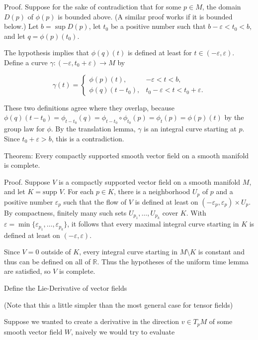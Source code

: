 Proof. 
Suppose for the sake of contradiction that for some \(p \in M\), 
the domain \(D(p)\) of \(\phi(p)\) is bounded above. (A similar proof works if it is bounded below.) 
Let \(b = \sup D(p)\), let \(t_0\) be a positive number such that \(b - \varepsilon < t_0 < b\), and let \(q = \phi(p)(t_0)\).

The hypothesis implies that \(\phi(q)(t)\) is defined at least for 
\(t \in (-\varepsilon, \varepsilon)\). 
Define a curve \(\gamma : (-\varepsilon, t_0 + \varepsilon) \to M\) by 

\[\gamma(t) = \begin{cases}
\phi(p)(t), & -\varepsilon < t < b, \\
\phi(q)(t - t_0), & t_0 - \varepsilon < t < t_0 + \varepsilon.
\end{cases}\]

These two definitions agree where they overlap, because 
\(\phi(q)(t - t_0) = \phi_{t-t_0}(q) = \phi_{t-t_0} \circ \phi_{t_0} (p) = \phi_{t} (p) = \phi(p)(t)\) 
by the group law for \(\phi\). 
By the translation lemma, \(\gamma\) is an integral curve starting at \(p\). 
Since \(t_0 + \varepsilon > b\), this is a contradiction.

Theorem: Every compactly supported smooth vector field on a smooth manifold is complete.

Proof. 
Suppose \(V\) is a compactly supported vector field on a smooth manifold \(M\), and let \(K = \text{supp } V\). 
For each \(p \in K\), there is a neighborhood \(U_p\) of \(p\) and a positive number \(\varepsilon_p\) 
such that the flow of \(V\) is defined at least on \((-\varepsilon_p, \varepsilon_p) \times U_p\). 
By compactness, finitely many such sets \(U_{p_1}, \dots, U_{p_k}\) cover \(K\). 
With \(\varepsilon = \min \{\varepsilon_{p_1}, \dots, \varepsilon_{p_k}\}\), 
it follows that every maximal integral curve starting in \(K\) is defined at least on \((-\varepsilon, \varepsilon)\). 

Since \(V = 0\) outside of \(K\), every integral curve starting in \(M \setminus K\) is constant 
and thus can be defined on all of \(\mathbb{R}\). 
Thus the hypotheses of the uniform time lemma are satisfied, so \(V\) is complete.

Define the Lie-Derivative of vector fields

(Note that this a little simpler than the most general case 
for tensor fields)

Suppose we wanted to create a derivative in the direction \( v \in T_p M \)
of some smooth vector field \( W \), naively we would try to evaluate

